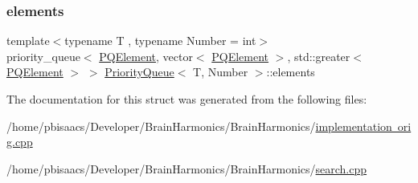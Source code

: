 \subsubsection{\texorpdfstring{elements}{elements}}
{\footnotesize\ttfamily template$<$typename T , typename Number  = int$>$ \\
priority\+\_\+queue$<$ \mbox{\hyperlink{structPriorityQueue_ae86a19aae3f9a32a1d76dfdab34eb70b}{P\+Q\+Element}}, vector$<$ \mbox{\hyperlink{structPriorityQueue_ae86a19aae3f9a32a1d76dfdab34eb70b}{P\+Q\+Element}} $>$, std\+::greater$<$ \mbox{\hyperlink{structPriorityQueue_ae86a19aae3f9a32a1d76dfdab34eb70b}{P\+Q\+Element}} $>$ $>$ \mbox{\hyperlink{structPriorityQueue}{Priority\+Queue}}$<$ T, Number $>$\+::elements}



The documentation for this struct was generated from the following files\+:\begin{DoxyCompactItemize}
\item 
/home/pbisaacs/\+Developer/\+Brain\+Harmonics/\+Brain\+Harmonics/\mbox{\hyperlink{implementation_01orig_8cpp}{implementation orig.\+cpp}}\item 
/home/pbisaacs/\+Developer/\+Brain\+Harmonics/\+Brain\+Harmonics/\mbox{\hyperlink{search_8cpp}{search.\+cpp}}\end{DoxyCompactItemize}
